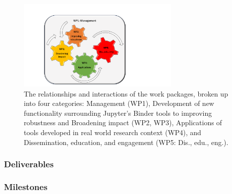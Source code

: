 \begin{figure}[htb]
  \centering
  \includegraphics[width=0.7\textwidth]{images/WP.pdf}
  \caption{
    \label{fig:workpackages}
    The relationships and interactions of the work packages,
    broken up into four categories: Management (WP1),
    Development of new functionality surrounding Jupyter's Binder tools to improving robustness 
    and Broadening impact (WP2, WP3),
    Applications of tools developed in real world research context (WP4),
    and Dissemination, education, and engagement (WP5: Dis., edu., eng.).
  }
\end{figure}


\ganttchart[draft,xscale=.4,milestones,yscale=0.9,step=3]


\ifgrantagreement\else
\newpage
\subsubsection{Deliverables}\label{sec:deliverables}
\fi

\subsubsection{Milestones}\label{sec:milestones}









